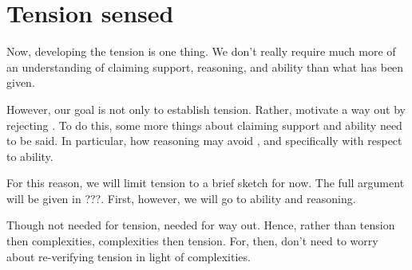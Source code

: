 \chapter{Tension sensed}

\begin{note}
  Now, developing the tension is one thing.
  We don't really require much more of an understanding of claiming support, reasoning, and ability than what has been given.

  However, our goal is not only to establish tension.
  Rather, motivate a way out by rejecting \ESU{}.
  To do this, some more things about claiming support and ability need to be said.
  In particular, how reasoning may avoid \ESU{}, and specifically with respect to ability.

  For this reason, we will limit tension to a brief sketch for now.
  The full argument will be given in {\color{red} ???}.
  First, however, we will go to ability and reasoning.

  Though not needed for tension, needed for way out.
  Hence, rather than tension then complexities, complexities then tension.
  For, then, don't need to worry about re-verifying tension in light of complexities.
\end{note}



